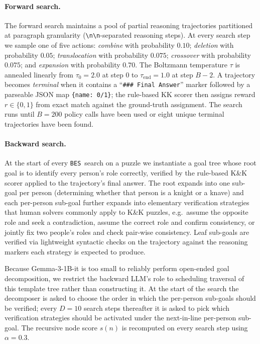 \documentclass{llmxive}
\providecommand{\ours}{\texttt{BES}}
\begin{document}
\paragraph{Forward search.}
The forward search maintains a pool of partial reasoning trajectories
partitioned at paragraph granularity (\verb|\n\n|-separated reasoning
steps). At every search step we sample one of five actions:
\emph{combine} with probability $0.10$; \emph{deletion} with probability $0.05$; \emph{translocation} with probability $0.075$; \emph{crossover}
with probability $0.075$; and \emph{expansion}
with probability $0.70$.
The Boltzmann temperature $\tau$ is annealed linearly from
$\tau_0=2.0$ at step $0$ to $\tau_\mathrm{end}=1.0$ at step $B{-}2$.
A trajectory becomes \emph{terminal} when it contains a
``\verb|### Final Answer|'' marker followed by a parseable JSON map
\verb|{name: 0/1}|; the rule-based KK scorer then assigns reward
$r\in\{0,1\}$ from exact match against the ground-truth assignment. The
search runs until $B=200$ policy calls have been used or eight unique
terminal trajectories have been found.


\paragraph{Backward search.}
At the start of every \ours\ search on a puzzle we instantiate a goal
tree whose root goal is to identify every person's role correctly,
verified by the rule-based K\&K scorer applied to the trajectory's
final answer. The root expands into one sub-goal per person (determining whether that person is a knight or a knave) and each
per-person sub-goal further expands into elementary verification
strategies that human solvers commonly apply to K\&K puzzles, e.g.\
assume the opposite role and seek a contradiction, assume the correct
role and confirm consistency, or jointly fix two people's roles and
check pair-wise consistency. Leaf sub-goals are verified via
lightweight syntactic checks on the trajectory against the reasoning
markers each strategy is expected to produce.

Because Gemma-3-1B-it is too small to reliably perform open-ended goal
decomposition, we restrict the backward LLM's
role to scheduling traversal of this template tree rather than
constructing it. At the start of the search the decomposer is asked to
choose the order in which the per-person sub-goals should be verified;
every $D=10$ search steps thereafter it is asked to pick which
verification strategies should be activated under the next-in-line
per-person sub-goal. 
The recursive node score $s(n)$ is recomputed on every search step using $\alpha=0.3$.
\end{document}
